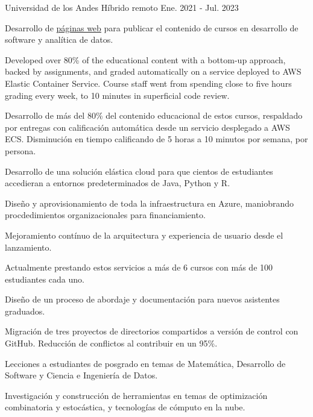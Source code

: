 \begin{cventries}
	{Universidad de los Andes} %
	{Híbrido remoto} %
	{Ene. 2021 {-} Jul. 2023} %
	{
		\begin{cvitems} %
			\item {Desarrollo de \href{https://copa-uniandes.github.io/PAD-web-tutorials/intro.html}{páginas web} para publicar el contenido de cursos en desarrollo de software y analítica de datos.}
			\item {Developed over 80\% of the educational content with a bottom-up approach, backed by assignments, and graded automatically on a service deployed to AWS Elastic Container Service. Course staff went from spending close to five hours grading every week, to 10 minutes in superficial code review.}
			\item {Desarrollo de más del 80\% del contenido educacional de estos cursos, respaldado por entregas con calificación automática desde un servicio desplegado a AWS ECS. Disminución en tiempo calificando de 5 horas a 10 minutos por semana, por persona.}
			\item {Desarrollo de una solución elástica cloud para que cientos de estudiantes accedieran a entornos predeterminados de Java, Python y R.}
			\item {Diseño y aprovisionamiento de toda la infraestructura en Azure, maniobrando procdedimientos organizacionales para financiamiento.}
			\item {Mejoramiento contínuo de la arquitectura y experiencia de usuario desde el lanzamiento.}
			\item {Actualmente prestando estos servicios a más de 6 cursos con más de 100 estudiantes cada uno.}
			\item {Diseño de un proceso de abordaje y documentación para nuevos asistentes graduados.}
			\item {Migración de tres proyectos de directorios compartidos a versión de control con GitHub. Reducción de conflictos al contribuir en un 95\%.}
			\item {Lecciones a estudiantes de posgrado en temas de Matemática, Desarrollo de Software y Ciencia e Ingeniería de Datos.}
			\item {Investigación y construcción de herramientas en temas de optimización combinatoria y estocástica, y tecnologías de cómputo en la nube.}
		\end{cvitems}
	}


\end{cventries}
